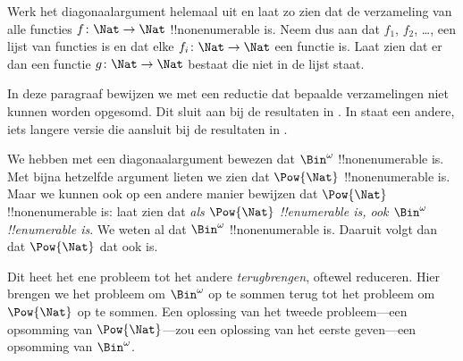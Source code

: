 \documentclass[openany]{memoir}
\begin{document}
\begin{prob}
Werk het diagonaalargument helemaal uit en laat zo zien dat de
verzameling van alle functies $f \colon \Nat \to \Nat$
!!{nonenumerable} is. Neem dus aan dat $f_1$, $f_2$, \dots, een lijst
van functies is en dat elke $f_i\colon \Nat \to \Nat$ een functie is.
Laat zien dat er dan een functie $g \colon \Nat \to \Nat$ bestaat die
niet in de lijst staat.
\end{prob}
\endgroup

\begingroup
\def\olfilename{OLP-0040}
\def\olfilepath{content/sets-functions-relations/size-of-sets/}
\hypertarget{unit-OLP-0040}{}





\begin{editorial}
  In deze paragraaf bewijzen we met een reductie dat bepaalde
  verzamelingen niet kunnen worden opgesomd. Dit sluit aan bij de resultaten in
  . In  staat een andere, iets
  langere versie die aansluit bij de resultaten in
  .
\end{editorial}

We hebben met een diagonaalargument bewezen dat $\Bin^\omega$
!!{nonenumerable} is. Met bijna hetzelfde argument lieten we zien dat
$\Pow{\Nat}$ !!{nonenumerable} is. Maar we kunnen ook op een andere
manier bewijzen dat $\Pow{\Nat}$ !!{nonenumerable} is: laat zien dat
\emph{als $\Pow{\Nat}$ !!{enumerable} is, ook $\Bin^\omega$
!!{enumerable} is}. We weten al dat $\Bin^\omega$
!!{nonenumerable} is. Daaruit volgt dan dat $\Pow{\Nat}$ dat ook is.

Dit heet het ene probleem tot het andere \emph{terugbrengen}, oftewel
reduceren. Hier brengen we het probleem om $\Bin^\omega$ op te sommen
terug tot het probleem om $\Pow{\Nat}$ op te sommen. Een oplossing van
het tweede probleem---een opsomming van $\Pow{\Nat}$---zou een
oplossing van het eerste geven---een opsomming van $\Bin^\omega$.
\end{document}
